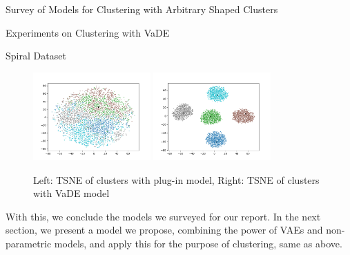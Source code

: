 \documentclass{article}
\begin{document}
\begin{psection}{Survey of Models for Clustering with Arbitrary Shaped Clusters}
\begin{psubsection}{Experiments on Clustering with VaDE}
\begin{pssubsection}{Spiral Dataset}
			\begin{figure}[h!]
				\centering
				\includegraphics[width=0.4\textwidth, trim={2.8cm 1.8cm 2.1cm 2cm}, clip]{includes/plots/spiral/tsne-gmm.png}
				\hspace{0.5cm}
				\includegraphics[width=0.4\textwidth, trim={2.8cm 1.8cm 2.1cm 2cm}, clip]{includes/plots/spiral/tsne-vade.png}
				\caption{Left: TSNE of clusters with plug-in model, Right: TSNE of clusters with VaDE model}
				\label{fig:spiral-tsne}
			\end{figure}
		\end{pssubsection}
	\end{psubsection}

	With this, we conclude the models we surveyed for our report. In the next section, we present a model we propose, combining the power of VAEs and non-parametric models, and apply this for the purpose of clustering, same as above.
\end{psection}
\end{document}
